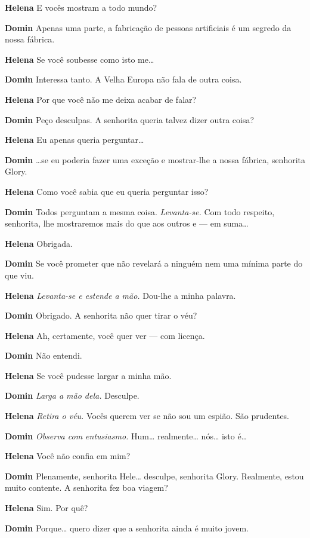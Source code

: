 \textbf{Helena} E vocês mostram a todo mundo?

\textbf{Domin} Apenas uma parte, a fabricação de pessoas artificiais é um segredo da
nossa fábrica.

\textbf{Helena} Se você soubesse como isto me\ldots{}

\textbf{Domin} Interessa tanto. A Velha Europa não fala de outra coisa.

\textbf{Helena} Por que você não me deixa acabar de falar?

\textbf{Domin} Peço desculpas. A senhorita queria talvez dizer outra coisa?

\textbf{Helena} Eu apenas queria perguntar\ldots{}

\textbf{Domin} \ldots{}se eu poderia fazer uma exceção e mostrar-lhe a nossa fábrica,
senhorita Glory.

\textbf{Helena} Como você sabia que eu queria perguntar isso?

\textbf{Domin} Todos perguntam a mesma coisa. \emph{Levanta-se.} Com todo respeito,
senhorita, lhe mostraremos mais do que aos outros e --- em suma\ldots{}

\textbf{Helena} Obrigada.

\textbf{Domin} Se você prometer que não revelará a ninguém nem uma mínima parte do que
viu.

\textbf{Helena} \emph{Levanta-se e estende a mão.} Dou-lhe a minha palavra.

\textbf{Domin} Obrigado. A senhorita não quer tirar o véu?

\textbf{Helena} Ah, certamente, você quer ver --- com licença.

\textbf{Domin} Não entendi.

\textbf{Helena} Se você pudesse largar a minha mão.

\textbf{Domin} \emph{Larga a mão dela.} Desculpe.

\textbf{Helena} \emph{Retira o véu.} Vocês querem ver se não sou um espião. São
prudentes.

\textbf{Domin} \emph{Observa com entusiasmo.} Hum\ldots{} realmente\ldots{} nós\ldots{} isto é\ldots{}

\textbf{Helena} Você não confia em mim?

\textbf{Domin} Plenamente, senhorita Hele\ldots{} desculpe, senhorita Glory. Realmente, estou
muito contente. A senhorita fez boa viagem?

\textbf{Helena} Sim. Por quê?

\textbf{Domin} Porque\ldots{} quero dizer que a senhorita ainda é muito jovem.

